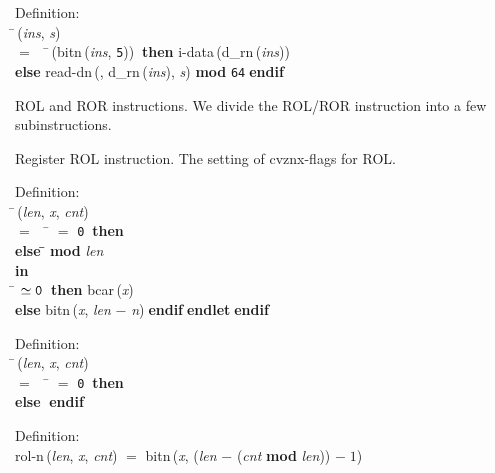 \begin{tabbing}{\sc Definition}: \\  
\=\,({\it{ins\/}}, {\it{s\/}}) \\ 
$=$$\;\;\;\;$\=\,({\rm{bitn}}\,({\it{ins\/}}, {\tt{5}}))$\;\;${\bf then }{\rm{i-data}}\,({\rm{d\_rn}}\,({\it{ins\/}})) \\ 
{\bf else }{\rm{read-dn}}\,({}, {\rm{d\_rn}}\,({\it{ins\/}}), {\it{s\/}}) ${}${\bf{mod}}${}$ {\tt{64}}$\;${\bf  endif}\-\-
\end{tabbing}

 ROL and ROR instructions.
 We divide the ROL/ROR instruction into a few subinstructions.

 Register ROL instruction.
 The setting of cvznx-flags for ROL.
\begin{tabbing}{\sc Definition}: \\  
\=\,({\it{len\/}}, {\it{x\/}}, {\it{cnt\/}}) \\ 
$=$$\;\;\;\;$\= $=$ {\tt{0}}$\;\;${\bf then }{} \\ 
{\bf else }\=\= ${}${\bf{mod}}${}$ {\it{len\/}}\- \\ 
{\bf in} \\ 
\= $\simeq {\tt{0}}$$\;\;${\bf then }{\rm{bcar}}\,({\it{x\/}}) \\ 
{\bf else }{\rm{bitn}}\,({\it{x\/}}, {\it{len\/}} $-$ {\it{n\/}})$\;${\bf  endif}\-$\;${\bf  endlet}\-$\;${\bf  endif}\-\-
\end{tabbing}

\begin{tabbing}{\sc Definition}: \\  
\=\,({\it{len\/}}, {\it{x\/}}, {\it{cnt\/}}) \\ 
$=$$\;\;\;\;$\= $=$ {\tt{0}}$\;\;${\bf then }{} \\ 
{\bf else }{}$\;${\bf  endif}\-\-
\end{tabbing}

\begin{tabbing}{\sc Definition}: \\  
{\rm{rol-n}}\,({\it{len\/}}, {\it{x\/}}, {\it{cnt\/}}) $=$ {\rm{bitn}}\,({\it{x\/}}, ({\it{len\/}} $-$ ({\it{cnt\/}} ${}${\bf{mod}}${}$ {\it{len\/}})) $-\;1$)
\end{tabbing}

